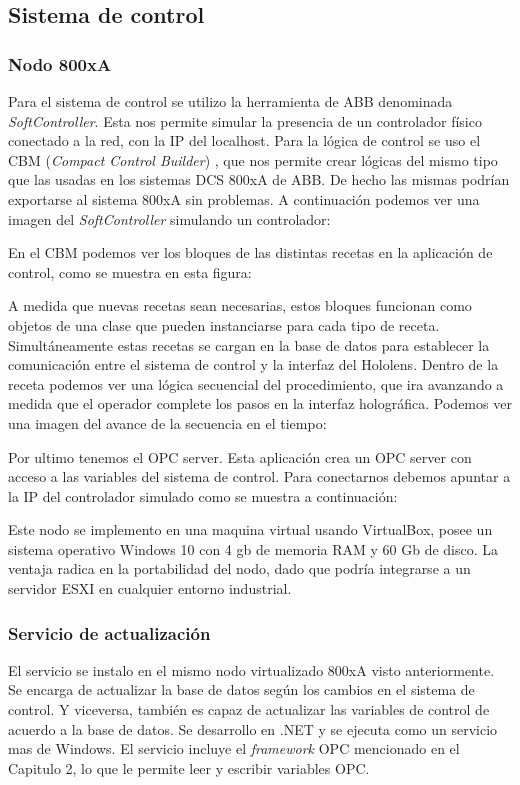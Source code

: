 \subsection{Sistema de control}
\subsubsection{Nodo 800xA}
Para el sistema de control se utilizo la herramienta de ABB denominada \textit{SoftController}. Esta nos permite simular la presencia de un controlador físico conectado a la red, con la IP del localhost. Para la lógica de control se uso el CBM (\textit{Compact Control Builder}) , que nos permite crear lógicas del mismo tipo que las usadas en los sistemas DCS 800xA de ABB. De hecho las mismas podrían exportarse al sistema 800xA sin problemas. A continuación podemos ver una imagen del \textit{SoftController} simulando un controlador:

En el CBM podemos ver los bloques de las distintas recetas en la aplicación de control, como se muestra en esta figura:


A medida que nuevas recetas sean necesarias, estos bloques funcionan como objetos de una clase que pueden instanciarse para cada tipo de receta. Simultáneamente estas recetas se cargan en la base de datos para establecer la comunicación entre el sistema de control y la interfaz del Hololens. Dentro de la receta podemos ver una lógica secuencial del procedimiento, que ira avanzando a medida que el operador complete los pasos en la interfaz holográfica. Podemos ver una imagen del avance de la secuencia en el tiempo:

Por ultimo tenemos el OPC server. Esta aplicación crea un OPC server con acceso a las variables del sistema de control. Para conectarnos debemos apuntar a la IP del controlador simulado como se muestra a continuación:

Este nodo se implemento en una maquina virtual usando VirtualBox, posee un sistema operativo Windows 10 con 4 gb de memoria RAM y 60 Gb de disco. La ventaja radica en la portabilidad del nodo, dado que podría integrarse a un servidor ESXI en cualquier entorno industrial. 

\subsubsection{Servicio de actualización}

El servicio se instalo en el mismo nodo virtualizado 800xA visto anteriormente. Se encarga de actualizar la base de datos según los cambios en el sistema de control. Y viceversa, también es capaz de actualizar las variables de control de acuerdo a la base de datos. Se desarrollo en .NET y se ejecuta  como un servicio mas de Windows. El servicio incluye el \textit{framework} OPC mencionado en el Capitulo 2, lo que le permite leer y escribir variables OPC. 

